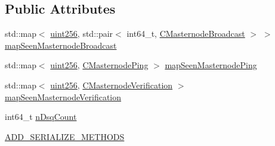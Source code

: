 \subsection*{Public Attributes}
\begin{DoxyCompactItemize}
\item 
std\+::map$<$ \mbox{\hyperlink{classuint256}{uint256}}, std\+::pair$<$ int64\+\_\+t, \mbox{\hyperlink{class_c_masternode_broadcast}{C\+Masternode\+Broadcast}} $>$ $>$ \mbox{\hyperlink{class_c_masternode_man_ac5a23d1da696b20b0cd74930d6752e8e}{map\+Seen\+Masternode\+Broadcast}}
\item 
std\+::map$<$ \mbox{\hyperlink{classuint256}{uint256}}, \mbox{\hyperlink{class_c_masternode_ping}{C\+Masternode\+Ping}} $>$ \mbox{\hyperlink{class_c_masternode_man_acdaf36c846ff68fcdc94785d70237141}{map\+Seen\+Masternode\+Ping}}
\item 
std\+::map$<$ \mbox{\hyperlink{classuint256}{uint256}}, \mbox{\hyperlink{class_c_masternode_verification}{C\+Masternode\+Verification}} $>$ \mbox{\hyperlink{class_c_masternode_man_a18a7b718a7d7a7fbb22f8701b0a0b9df}{map\+Seen\+Masternode\+Verification}}
\item 
int64\+\_\+t \mbox{\hyperlink{class_c_masternode_man_a8527c447711c3909cf1bdefec1a7e9be}{n\+Dsq\+Count}}
\item 
\mbox{\hyperlink{class_c_masternode_man_ae39ed8b30469e9fdc42aa09d175e1f78}{A\+D\+D\+\_\+\+S\+E\+R\+I\+A\+L\+I\+Z\+E\+\_\+\+M\+E\+T\+H\+O\+DS}}
\end{DoxyCompactItemize}
